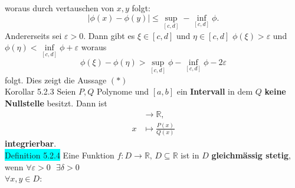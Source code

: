 \documentclass[landscape, 10pt]{article}
\newcommand{\R}{\mathbb{R}}
\begin{document}
\begin{multicols}{3}
                     woraus durch vertauschen von 
                     \textcolor{NavyBlue}{$x,y$} folgt:
                     \begin{equation*}
                            |\phi(x)-\phi(y)|\leqslant
                            \sup\limits_{[c,d]}
                            -\inf\limits_{[c,d]}\phi. 
                     \end{equation*}
                     Andererseits sei 
                     \textcolor{NavyBlue}{$\varepsilon>0$}. 
                     Dann gibt es 
                     \textcolor{NavyBlue}{$\xi\in[c,d]$}
                     und \textcolor{NavyBlue}{
                     $\eta\in[c,d]$ $\phi(\xi)>\varepsilon$} und 
                     \textcolor{NavyBlue}{
                     $\phi(\eta)<\inf\limits_{[c,d]}\phi
                     +\varepsilon$} 
                     woraus 
                     \begin{equation*}
                            \phi(\xi)-\phi(\eta)
                            >\sup\limits_{[c,d]}\phi
                            -\inf\limits_{[c,d]}\phi-2
                            \varepsilon  
                     \end{equation*}
                     folgt. Dies zeigt die Aussage $(*)$ \\
              \colorbox{BurntOrange}{Korollar 5.2.3} 
                     Seien \textcolor{NavyBlue}{$P,Q$} 
                     Polynome und 
                     \textcolor{NavyBlue}{$[a,b]$}
                     ein \textbf{Intervall} in dem 
                     \textcolor{NavyBlue}{$Q$} 
                     \textbf{keine Nullstelle} besitzt. Dann ist
                     \begin{align*}
                            [a,b]&\longrightarrow\R,\\
                            x&\mapsto\frac{P(x)}{Q(x)}
                     \end{align*} 
                     \textbf{integrierbar}.\\
              \colorbox{cyan}{Definition 5.2.4} 
                     Eine Funktion 
                     \textcolor{NavyBlue}{
                     $f:D\longrightarrow\R,\,D\subseteq\R$}
                     ist in \textcolor{NavyBlue}{$D$} 
                     \textbf{gleichmässig stetig}, wenn 
                     \textcolor{NavyBlue}{
                     $\forall\varepsilon>0\,\enspace
                     \exists\delta>0$\\
                     $\forall x,y\in D$}:

\end{multicols}
\end{document}
